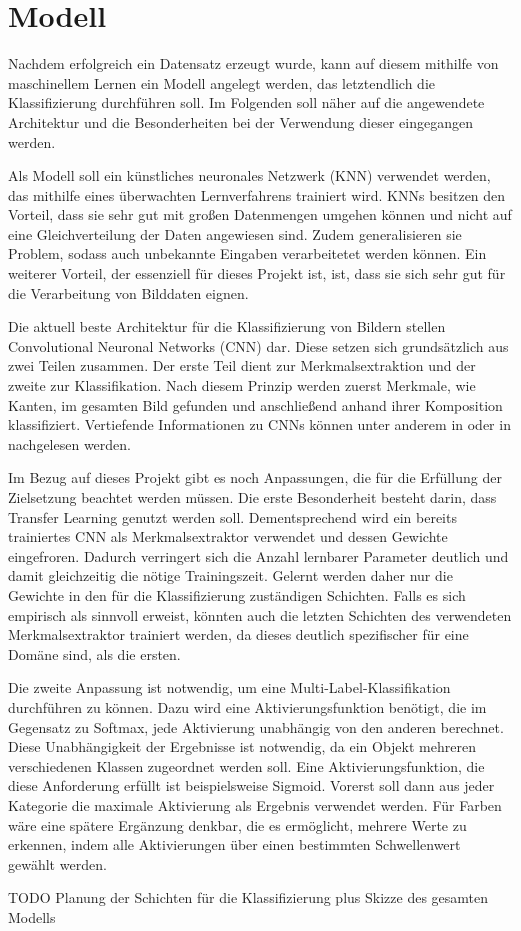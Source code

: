 \section{Modell} \label{sec:model}

Nachdem erfolgreich ein Datensatz erzeugt wurde, kann auf diesem mithilfe von maschinellem Lernen ein Modell angelegt werden, das letztendlich die Klassifizierung durchführen soll. Im Folgenden soll näher auf die angewendete Architektur und die Besonderheiten bei der Verwendung dieser eingegangen werden.

Als Modell soll ein künstliches neuronales Netzwerk (KNN) verwendet werden, das mithilfe eines überwachten Lernverfahrens trainiert wird. KNNs besitzen den Vorteil, dass sie sehr gut mit großen Datenmengen umgehen können und nicht auf eine Gleichverteilung der Daten angewiesen sind. Zudem generalisieren sie Problem, sodass auch unbekannte Eingaben verarbeitetet werden können. Ein weiterer Vorteil, der essenziell für dieses Projekt ist, ist, dass sie sich sehr gut für die Verarbeitung von Bilddaten eignen. \cite{Mahanta2020}

Die aktuell beste Architektur für die Klassifizierung von Bildern stellen Convolutional Neuronal Networks (CNN) dar. Diese setzen sich grundsätzlich aus zwei Teilen zusammen. Der erste Teil dient zur Merkmalsextraktion und der zweite zur Klassifikation. Nach diesem Prinzip werden zuerst Merkmale, wie Kanten, im gesamten Bild gefunden und anschließend anhand ihrer Komposition klassifiziert. Vertiefende Informationen zu CNNs können unter anderem in \cite{Goodfellow2016} oder in \cite{CS2020} nachgelesen werden.

Im Bezug auf dieses Projekt gibt es noch Anpassungen, die für die Erfüllung der Zielsetzung beachtet werden müssen. Die erste Besonderheit besteht darin, dass Transfer Learning genutzt werden soll. Dementsprechend wird ein bereits trainiertes CNN als Merkmalsextraktor verwendet und dessen Gewichte eingefroren. Dadurch verringert sich die Anzahl lernbarer Parameter deutlich und damit gleichzeitig die nötige Trainingszeit. Gelernt werden daher nur die Gewichte in den für die Klassifizierung zuständigen Schichten. Falls es sich empirisch als sinnvoll erweist, könnten auch die letzten Schichten des verwendeten Merkmalsextraktor trainiert werden, da dieses deutlich spezifischer für eine Domäne sind, als die ersten. 

Die zweite Anpassung ist notwendig, um eine Multi-Label-Klassifikation durchführen zu können. Dazu wird eine Aktivierungsfunktion benötigt, die im Gegensatz zu Softmax, jede Aktivierung unabhängig von den anderen berechnet. Diese Unabhängigkeit der Ergebnisse ist notwendig, da ein Objekt mehreren verschiedenen Klassen zugeordnet werden soll. Eine Aktivierungsfunktion, die diese Anforderung erfüllt ist beispielsweise Sigmoid. Vorerst soll dann aus jeder Kategorie die maximale Aktivierung als Ergebnis verwendet werden. Für Farben wäre eine spätere Ergänzung denkbar, die es ermöglicht, mehrere Werte zu erkennen, indem alle Aktivierungen über einen bestimmten Schwellenwert gewählt werden. 

TODO Planung der Schichten für die Klassifizierung plus Skizze des gesamten Modells

